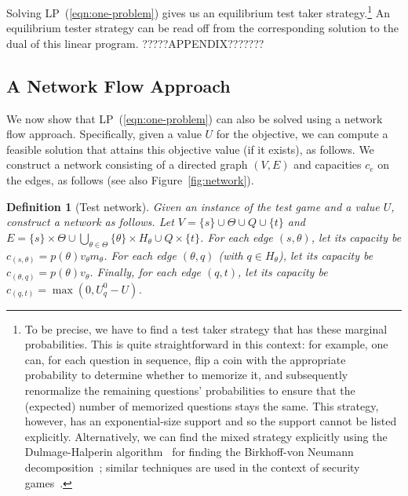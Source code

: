 \documentclass{article}
\newtheorem{definition}{Definition}
\begin{document}
Solving LP~(\ref{eqn:one-problem}) 
gives us an equilibrium test taker strategy.\footnote{To be precise, we have to
find a test taker strategy that has these marginal probabilities.
This is quite straightforward in this context: for example, one can, for
each question in sequence, flip a coin with the appropriate probability to
determine whether to memorize it, and subsequently renormalize the remaining
questions' probabilities to ensure that the (expected) number of memorized
questions stays the same.  This strategy, however, has an
exponential-size support and so the support cannot be listed explicitly.
Alternatively, we can find the mixed strategy
explicitly using the Dulmage-Halperin
algorithm~\cite{Dulmage55:Frobenius,Chang01:Birkhoff} for finding the
Birkhoff-von Neumann decomposition~\cite{Birkhoff46:Tres}; similar
techniques are used in the context of security
games~\cite{Korzhyk10:Complexity}.}
An equilibrium tester strategy can be read off from the corresponding
solution to the dual of this linear program. ?????APPENDIX???????

\subsection{A Network Flow Approach}

We now show that LP~(\ref{eqn:one-problem}) can also be solved using a
network flow approach.
Specifically, given a value $U$ for the objective, we can compute a
feasible solution that attains this objective value (if it exists), as
follows.  We construct a network consisting of a directed graph $(V, E)$
and capacities $c_e$ on the edges, as follows (see also
Figure~\ref{fig:network}). 

\begin{definition}[Test network]
Given an instance of the  test game and a value $U$, construct a network as follows.
Let $V = \{s\} \cup \Theta \cup Q \cup \{t\}$
and 
$E = \{s\} \times \Theta \cup \bigcup_{\theta \in \Theta} \{\theta\} \times
H_\theta \cup Q \times \{t\}$.
For each edge $(s, \theta)$, let its capacity be $c_{(s,
\theta)} = p(\theta) v_\theta m_\theta$. For each edge $(\theta, q)$ (with
$q \in H_\theta$), let its
capacity be $c_{(\theta, q)} = p(\theta) v_\theta$.
Finally, for each edge $(q, t)$, let its capacity be $c_{(q, t)} = \max(0,
U_q^0-U)$.
\end{definition}
\end{document}

